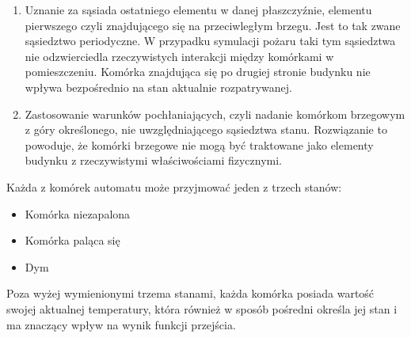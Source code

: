 \begin {enumerate}
\item Uznanie za sąsiada ostatniego elementu w danej płaszczyźnie, elementu pierwszego czyli znajdującego się na przeciwległym brzegu. Jest to tak zwane sąsiedztwo
periodyczne. W przypadku symulacji pożaru taki tym sąsiedztwa nie odzwierciedla rzeczywistych interakcji między komórkami w pomieszczeniu. Komórka znajdująca się 
po drugiej stronie budynku nie wpływa bezpośrednio na stan aktualnie rozpatrywanej.
\item Zastosowanie warunków pochłaniających, czyli nadanie komórkom brzegowym z góry określonego, nie uwzględniającego sąsiedztwa stanu. Rozwiązanie to 
powoduje, że komórki brzegowe nie mogą być traktowane jako elementy budynku z rzeczywistymi właściwościami fizycznymi.
\end{enumerate}

Każda z komórek automatu może przyjmować jeden z trzech stanów:
\begin{itemize}
\item Komórka niezapalona
\item Komórka paląca się
\item Dym
\end{itemize}
Poza wyżej wymienionymi trzema stanami, każda komórka posiada wartość swojej aktualnej temperatury, która również w sposób pośredni określa jej stan i ma znaczący
wpływ na wynik funkcji przejścia.

